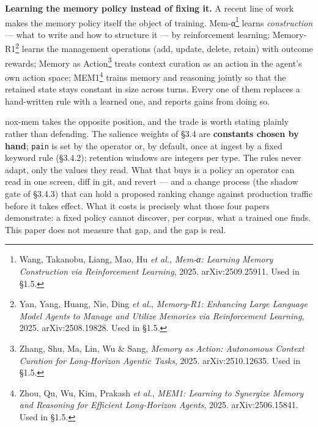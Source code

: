 \documentclass[
]{article}
\begin{document}
\textbf{Learning the memory policy instead of fixing it.} A recent line
of work makes the memory policy itself the object of training.
Mem-α\footnote{Wang, Takanobu, Liang, Mao, Hu \emph{et al.},
  \emph{Mem-α: Learning Memory Construction via Reinforcement Learning},
  2025. arXiv:2509.25911. Used in §1.5.} learns \emph{construction} ---
what to write and how to structure it --- by reinforcement learning;
Memory-R1\footnote{Yan, Yang, Huang, Nie, Ding \emph{et al.},
  \emph{Memory-R1: Enhancing Large Language Model Agents to Manage and
  Utilize Memories via Reinforcement Learning}, 2025. arXiv:2508.19828.
  Used in §1.5.} learns the management operations (add, update, delete,
retain) with outcome rewards; Memory as Action\footnote{Zhang, Shu, Ma,
  Lin, Wu \& Sang, \emph{Memory as Action: Autonomous Context Curation
  for Long-Horizon Agentic Tasks}, 2025. arXiv:2510.12635. Used in §1.5.}
treats context curation as an action in the agent's own action space;
MEM1\footnote{Zhou, Qu, Wu, Kim, Prakash \emph{et al.}, \emph{MEM1:
  Learning to Synergize Memory and Reasoning for Efficient Long-Horizon
  Agents}, 2025. arXiv:2506.15841. Used in §1.5.} trains memory and
reasoning jointly so that the retained state stays constant in size
across turns. Every one of them replaces a hand-written rule with a
learned one, and reports gains from doing so.

nox-mem takes the opposite position, and the trade is worth stating
plainly rather than defending. The salience weights of §3.4 are
\textbf{constants chosen by hand}; \texttt{pain} is set by the operator
or, by default, once at ingest by a fixed keyword rule (§3.4.2);
retention windows are integers per type. The rules never adapt, only the
values they read. What that buys is a policy an operator can read in one
screen, diff in git, and revert --- and a change process (the shadow
gate of §3.4.3) that can hold a proposed ranking change against
production traffic before it takes effect. What it costs is precisely
what those four papers demonstrate: a fixed policy cannot discover, per
corpus, what a trained one finds. This paper does not measure that gap,
and the gap is real.
\end{document}
